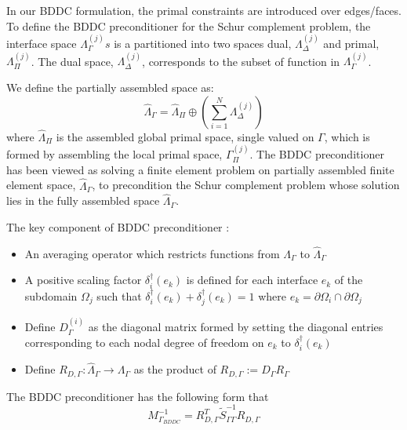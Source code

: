 In our BDDC formulation, the primal constraints are introduced over edges/faces. To define the BDDC preconditioner for the Schur complement problem, the interface space $ \Lambda_{\Gamma}^{(j)}s $ is a partitioned into two spaces dual, $ \Lambda_{\Delta}^{(j)} $  and primal, $ \Lambda_{\Pi}^{(j)} $. The dual space, $ \Lambda_{\Delta}^{(j)} $, corresponds to the subset of function in $ \Lambda_{\Gamma}^{(j)} $.

We define the partially assembled space as:
\begin{equation}
\hat{\Lambda}_{\Gamma} = \hat{\Lambda}_{\Pi} \oplus (\sum_{i = 1}^{N} \Lambda_{\Delta}^{(j)})
\end{equation}
where $ \hat{\Lambda}_{\Pi} $ is the assembled global primal space, single valued on $ \Gamma $, which is formed by assembling the local primal space, $ \Gamma_{\Pi}^{(j)} $. The BDDC preconditioner has been viewed as solving a finite element problem on partially assembled finite element space, $ \hat{\Lambda}_{\Gamma} $, to precondition the Schur complement problem whose solution lies in the fully assembled space $ \hat{\Lambda}_{\Gamma} $.

The key component of BDDC preconditioner \cite{eisenstat1981efficient}:
\begin{itemize}
	\item 	An averaging operator which restricts functions from $ \Lambda_{\Gamma} $  to $ \hat{\Lambda}_{\Gamma} $
	\item	A positive scaling factor $ \delta_{i}^{\dagger} (e_k) $ is defined for each interface $ e_k $ of the subdomain $ \Omega_j $ such that $ \delta_{i}^{\dagger} (e_k) + \delta_{j}^{\dagger}(e_{k}) = 1 $ where $ e_k = \partial \Omega_i \cap \partial \Omega_j$
	\item	Define $ D_{\Gamma}^{(i)} $ as the diagonal matrix formed by setting the diagonal entries corresponding to each nodal degree of freedom on $ e_k $ to $ \delta_{i}^{\dagger} (e_k) $
	\item	Define $ R_{D, \Gamma} : \hat{\Lambda}_{\Gamma} \rightarrow \Lambda_\Gamma$ as the product of $ R_{D, \Gamma} := D_{\Gamma} R_{\Gamma} $
\end{itemize}

The BDDC preconditioner has the following form that
\begin{equation}
M_{\Gamma_{BDDC}}^{-1} = R_{D, \Gamma}^{T} \tilde{S}_{\Gamma\Gamma}^{-1} R_{D, \Gamma}
\end{equation}

